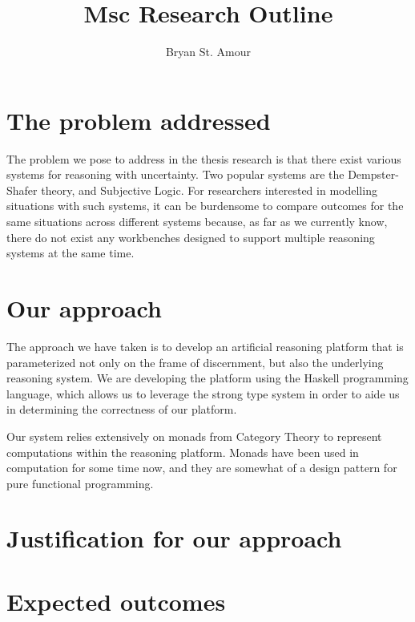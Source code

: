 \documentclass[a4paper]{article}
\title{Msc Research Outline}
\author{Bryan St. Amour}
\begin{document}
\maketitle

\section{The problem addressed}

\par
The problem we pose to address in the thesis research is that there exist various
systems for reasoning with uncertainty. Two popular systems are the
Dempster-Shafer theory, and Subjective Logic. For researchers interested in modelling
situations with such systems, it can be burdensome to compare outcomes for the same
situations across different systems because, as far as we currently know, there do
not exist any workbenches designed to support multiple reasoning systems at the same
time.

\section{Our approach}


\par
The approach we have taken is to develop an artificial reasoning platform that is
parameterized not only on the frame of discernment, but also the underlying
reasoning system. We are developing the platform using the Haskell programming
language, which allows us to leverage the strong type system in order to aide us
in determining the correctness of our platform.

\par
Our system relies extensively on monads from Category Theory to represent computations
within the reasoning platform. Monads have been used in computation for some time now,
and they are somewhat of a design pattern for pure functional programming.

\section{Justification for our approach}

\section{Expected outcomes}
\end{document}
